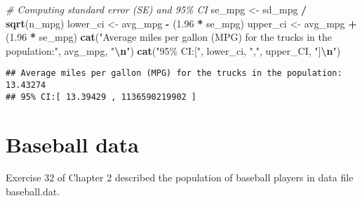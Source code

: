 \documentclass[]{article}
\newenvironment{Shaded}{\begin{snugshade}}{\end{snugshade}}
\newcommand{\CommentTok}[1]{\textcolor[rgb]{0.56,0.35,0.01}{\textit{#1}}}
\newcommand{\FloatTok}[1]{\textcolor[rgb]{0.00,0.00,0.81}{#1}}
\newcommand{\FunctionTok}[1]{\textcolor[rgb]{0.13,0.29,0.53}{\textbf{#1}}}
\newcommand{\NormalTok}[1]{#1}
\newcommand{\OtherTok}[1]{\textcolor[rgb]{0.56,0.35,0.01}{#1}}
\newcommand{\SpecialCharTok}[1]{\textcolor[rgb]{0.81,0.36,0.00}{\textbf{#1}}}
\newcommand{\StringTok}[1]{\textcolor[rgb]{0.31,0.60,0.02}{#1}}
\begin{document}
\begin{enumerate}[label=(\alph*)]
\begin{Shaded}
\begin{Highlighting}[]
\CommentTok{\# Computing standard error (SE) and 95\% CI }
\NormalTok{se\_mpg }\OtherTok{\textless{}{-}}\NormalTok{ sd\_mpg }\SpecialCharTok{/} \FunctionTok{sqrt}\NormalTok{(n\_mpg)}
\NormalTok{lower\_ci }\OtherTok{\textless{}{-}}\NormalTok{ avg\_mpg }\SpecialCharTok{{-}}\NormalTok{ (}\FloatTok{1.96} \SpecialCharTok{*}\NormalTok{ se\_mpg)}
\NormalTok{upper\_ci }\OtherTok{\textless{}{-}}\NormalTok{ avg\_mpg }\SpecialCharTok{+}\NormalTok{ (}\FloatTok{1.96} \SpecialCharTok{*}\NormalTok{ se\_mpg)}
\FunctionTok{cat}\NormalTok{(}\StringTok{"Average miles per gallon (MPG) for the trucks in the population:"}\NormalTok{,} 
    \NormalTok{avg\_mpg, }\StringTok{"}\SpecialCharTok{\textbackslash{}n}\StringTok{"}\NormalTok{)}
\FunctionTok{cat}\NormalTok{(}\StringTok{"95\% CI:["}\NormalTok{, lower\_ci, }\StringTok{","}\NormalTok{, upper\_CI, }\StringTok{"]}\SpecialCharTok{\textbackslash{}n}\StringTok{"}\NormalTok{)}
\end{Highlighting}
\end{Shaded}

\begin{verbatim}
## Average miles per gallon (MPG) for the trucks in the population: 13.43274
## 95% CI:[ 13.39429 , 1136590219902 ]
\end{verbatim}

\end{enumerate}

\section{Baseball data}

Exercise 32 of Chapter 2 described the population of baseball players in data file baseball.dat.
\end{document}
